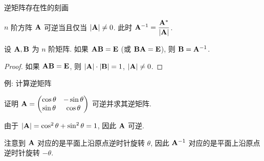 \begin{frame}{逆矩阵存在性的刻画}
	\onslide<+->
	\begin{theorem}
		$n$ 阶方阵 ${\mathbf{A}}$ 可逆当且仅当 $|{\mathbf{A}}|\neq 0$.
		此时 ${\mathbf{A}}^{-1}=\dfrac{{\mathbf{A}}^*}{|{\mathbf{A}}|}$.
	\end{theorem}
	\onslide<+->
	\begin{corollary}
		设 ${\mathbf{A}},{\mathbf{B}}$ 为 $n$ 阶矩阵.
		如果 ${\mathbf{A}}{\mathbf{B}}={\mathbf{E}}$ (或 ${\mathbf{B}}{\mathbf{A}}={\mathbf{E}}$), 则 ${\mathbf{B}}={\mathbf{A}}^{-1}$.
	\end{corollary}
	\onslide<+->
	\begin{proof}
		如果 ${\mathbf{A}}{\mathbf{B}}={\mathbf{E}}$, 则 $|{\mathbf{A}}|\cdot|{\mathbf{B}}|=1$, $|{\mathbf{A}}|\neq0$.
		\onslide<+->{%
		\[\bfA^{-1}=\bfA^{-1}(\bfA\bfB)=\bfB.\qedhere\]}
		\vspace{-\baselineskip}
	\end{proof}
\end{frame}


\begin{frame}{例: 计算逆矩阵}
	\onslide<+->
	\begin{example}
		证明 ${\mathbf{A}}=\begin{pmatrix}
			\cos\theta&-\sin\theta\\
			\sin\theta&\cos\theta
		\end{pmatrix}$ 可逆并求其逆矩阵.
	\end{example}
	\onslide<+->
	\begin{solution}
		由于 $|{\mathbf{A}}|=\cos^2\theta+\sin^2\theta=1$, 因此 ${\mathbf{A}}$ 可逆.
		\onslide<+->{由于 $\bfA^*=\begin{pmatrix}
			\cos\theta&\sin\theta\\
			-\sin\theta&\cos\theta
		\end{pmatrix}$, 因此
		\[\bfA^{-1}=\frac{\bfA^*}{|\bfA|}=\begin{pmatrix}
			\cos\theta&\sin\theta\\
			-\sin\theta&\cos\theta
		\end{pmatrix}.\]}
	\end{solution}
	\onslide<+->
	注意到 ${\mathbf{A}}$ 对应的是平面上沿原点逆时针旋转 $\theta$, 因此 ${\mathbf{A}}^{-1}$ 对应的是平面上沿原点逆时针旋转 $-\theta$.
\end{frame}



